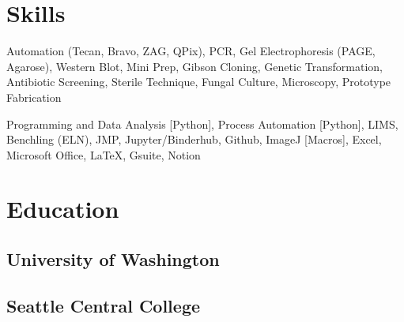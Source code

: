 \documentclass[]{forrest-resume-interfont}
\begin{document}
\spacesep


\linesep

\section{ Skills}
\spacesep
{}
Automation (Tecan, Bravo, ZAG, QPix),
PCR, 
Gel Electrophoresis (PAGE, Agarose), 
Western Blot,
Mini Prep, 
Gibson Cloning,
Genetic Transformation,
Antibiotic Screening,
Sterile Technique, 
Fungal Culture, 
Microscopy, 
Prototype Fabrication
\\
\spacesep

Programming and Data Analysis [Python],
Process Automation [Python],
LIMS,
Benchling (ELN),
JMP,
Jupyter/Binderhub,
Github,
ImageJ [Macros],
Excel,
Microsoft Office,
LaTeX,
Gsuite,
Notion

\spacesep
\linesep


\section{ Education}
\spacesep
\subsection{University of Washington}
\spacesep
\subsection{Seattle Central College}

\vfill

\noindent\makebox[\linewidth]{\color{black}\rule{\paperwidth}{0.4pt}}
\end{document}

